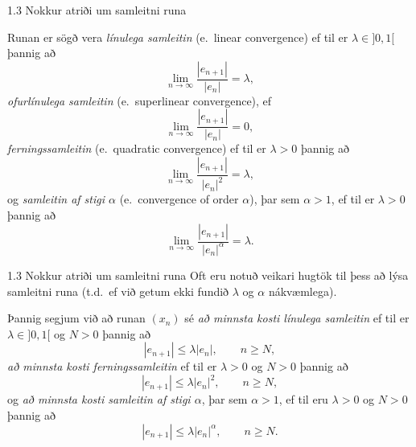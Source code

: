 %
\begin{frame}{1.3 Nokkur atriði um samleitni runa} 


Runan er sögð vera {\it  línulega samleitin} (e.~linear convergence) ef til er $\lambda\in ]0,1[$ þannig að
\begin{equation*}
	\lim_{n\to \infty}\dfrac{|e_{n+1}|}{|e_n|}=\lambda,
\end{equation*}\pause
{\it ofurlínulega samleitin} (e.~superlinear convergence), ef 
\begin{equation*}
	\lim_{n\to \infty}\dfrac{|e_{n+1}|}{|e_n|}=0,
\end{equation*}\pause
{\it ferningssamleitin} (e.~quadratic convergence) ef til er $\lambda>0$ þannig að
\begin{equation*}
	\lim_{n\to \infty}\dfrac{|e_{n+1}|}{|e_n|^2}=\lambda,
\end{equation*}\pause
og {\it samleitin af stigi $\alpha$} (e.~convergence of order $\alpha$), 
þar sem $\alpha> 1$, 
ef til er $\lambda>0$ þannig að
\begin{equation*}
	\lim_{n\to \infty}\dfrac{|e_{n+1}|}{|e_n|^\alpha}=\lambda.
\end{equation*}
\end{frame}
%
%
\begin{frame}{1.3 Nokkur atriði um samleitni runa} 
Oft eru notuð veikari hugtök til þess að lýsa samleitni runa
(t.d.~ef við getum ekki fundið $\lambda$ og $\alpha$ nákvæmlega). \pause

\smallskip

Þannig segjum við að runan $(x_n)$ sé  
{\it að minnsta kosti línulega samleitin} ef til er 
$\lambda\in ]0,1[$ og $N >0$ þannig að 
\begin{equation*}
	|e_{n+1}|\leq \lambda |e_n|, \qquad n\geq N,
\end{equation*}\pause
{\it að minnsta kosti ferningssamleitin} ef til er $\lambda>0$ og $N>0$ þannig að
\begin{equation*}
	|e_{n+1}|\leq \lambda |e_n|^2, \qquad n\geq N,
\end{equation*}\pause
og  {\it að minnsta kosti samleitin af stigi $\alpha$}, þar sem $\alpha> 1$, ef til eru $\lambda>0$ og $N>0$ þannig að
\begin{equation*}
	|e_{n+1}|\leq \lambda |e_n|^\alpha, \qquad n\geq N.
\end{equation*}
\end{frame}
%
%
